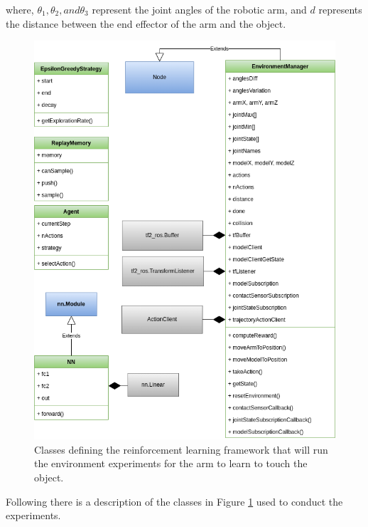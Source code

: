 \documentclass[12pt,oneside]{article}
\begin{document}
where, $\theta_1, \theta_2, and \theta_3$ represent the joint angles of the robotic arm, and $d$ represents the distance between the end effector of the arm and the object. 
\begin{figure}[H]
\centering
\includegraphics[width=0.95\linewidth]{uml_diagram_complete}
\caption[Classes and relationships in the reinforcement learning framework.]{Classes defining the reinforcement learning framework that will run the environment experiments for the arm to learn to touch the object.}
\label{fig:classdiagramcomplete}
\end{figure}
Following there is a description of the classes in Figure \ref{fig:classdiagramcomplete} used to conduct the experiments.
\end{document}
